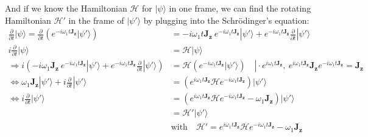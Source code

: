 \documentclass[11.5pt,a4paper]{article}
\begin{document}
And if we know the Hamiltonian $\mathcal{H}$ for $|\psi\rangle$ in one frame, we can find the rotating Hamiltonian $\mathcal{H}'$ in the frame of $|\psi'\rangle$ by plugging into the Schr\"odinger's equation:
\begin{align} 
  \frac{\partial}{\partial t} |\psi\rangle  =  \frac{\partial}{\partial t} \left( e^{-i \omega_1 t \mathbf{J_z}} | \psi' \rangle  \right) & = - i \omega_1 t \mathbf{J_z} \ e^{-i \omega_1 t \mathbf{J_z}} | \psi' \rangle + e^{-i \omega_1 t \mathbf{J_z}} \frac{\partial}{\partial t} | \psi' \rangle \\
  i\frac{\partial}{\partial t} |\psi\rangle   & = \mathcal{H} |\psi\rangle  \\
  \Rightarrow i \left( - i \omega_1 \mathbf{J_z} \ e^{-i \omega_1 t \mathbf{J_z}} | \psi' \rangle + e^{-i \omega_1 t \mathbf{J_z}} \frac{\partial}{\partial t} | \psi' \rangle \right)& = \mathcal{H} \left( e^{-i \omega_1 t \mathbf{J_z}} |\psi'\rangle \right) 
  \quad \left. \right| \cdot e^{i \omega_1 t \mathbf{J_z}},\ e^{i \omega_1 t \mathbf{J_z}} \mathbf{J_z} e^{-i \omega_1 t \mathbf{J_z}}= \mathbf{J_z} \\
  \Leftrightarrow \omega_1 \mathbf{J_z} | \psi' \rangle + i \frac{\partial}{\partial t} | \psi' \rangle & = \left( e^{i \omega_1 t \mathbf{J_z}} \mathcal{H} e^{-i \omega_1 t \mathbf{J_z}} \right) |\psi'\rangle \\
  \Leftrightarrow i \frac{\partial}{\partial t} | \psi' \rangle & = \left( e^{i \omega_1 t \mathbf{J_z}} \mathcal{H} e^{-i \omega_1 t \mathbf{J_z}}- \omega_1  \mathbf{J_z} \right) |\psi'\rangle \\
  & = \mathcal{H}'|\psi'\rangle \\
 &\text{with} \quad \mathcal{H}' = e^{i \omega_1 t \mathbf{J_z}} \mathcal{H} e^{-i \omega_1 t \mathbf{J_z}}- \omega_1  \mathbf{J_z} 
  \label{eq-rotating-hamiltonian}
\end{align}
\end{document}
